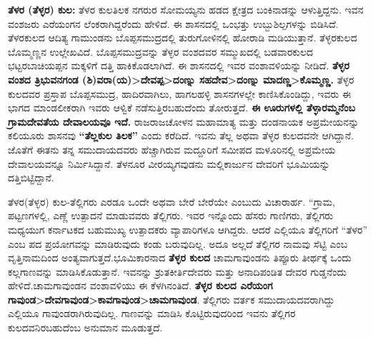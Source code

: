 \textbf{ತೆಳರ (ತೆಳ್ಳರ) ಕುಲ:} ತೆಳರ ಕುಲತಿಲಕ ನಗರುರ ಸೋಮಯ್ಯನು ಹಡದ ಕ್ಷೇತ್ರದ ಬಂಕಿನಾಡನ್ನು ಆಳುತ್ತಿದ್ದನು. ಇವನ ವಂಶಜರು ಎರೆಯಂಗನ ಲೆಂಕರಾಗಿದ್ದರೆಂದು ಹೇಳಿದೆ. ಈ ಶಾಸನದಲ್ಲಿ ಒಂಭತ್ತು ಉಬ್ಬುಶಿಲ್ಪಗಳನ್ನು ಬಿಡಿಸಿದೆ. ತೆಳರಕುಲದ ಆದಿತ್ಯ ಗಾಮುಂಡನು ಬೊಪ್ಪಸಮುದ್ರದಲ್ಲಿ ತುರುಗೋಳಿನಲ್ಲಿ ಹೋರಾಡಿ ಮಡಿಯುತ್ತಾನೆ. ತೆಳ್ಳರಕುಲದ ಬೊಮ್ಮಣ್ಣನ ಉಲ್ಲೇಖವಿದೆ. ಬೊಪ್ಪಸಮುದ್ರವನ್ನು ತೆಳ್ಳರ ವಂಶದವರ ಸಮ್ಮುಖದಲ್ಲಿ ಬಡವಾರಕುಲದ ಭಟ್ಟರಬಾಚಿಯಪ್ಪನ ಮಕ್ಕಳಿಗೆ ದತ್ತಿ ಹಾಕಿಕೊಡಲಾಗಿದೆ. ಈ ಶಾಸನದಲ್ಲಿ ಇವರ ವಂಶಾವಳಿಯನ್ನು ನೀಡಿದೆ. \textbf{ತೆಳ್ಳರ ವಂಶದ ತ್ರಿಭುವನಗಂಡ (ಶಿ)ವರಾ(ಯ)\textgreater  ದೇವಪ್ಪ\textgreater  ದಂಣ್ನು ಸಹದೇವ\textgreater  ದಂಣ್ನು ಮಾದಣ್ಣ\textgreater  ಕೊಮ್ಮಣ್ಣ. } ತೆಳ್ಳರ ಕುಲದವರ ಪ್ರಸ್ತಾಪ ಬೊಪ್ಪಸಮುದ್ರ, ಹಾದಿರವಾಗಿಲು, ಹಾಗಲಹಳ್ಳಿ ಶಾಸನಗಳಲ್ಲೇ ಕಾಣಿಸಿಕೊಂಡಿದ್ದು, ಇವರು ಈ ಭಾಗದ ಮಾಂಡಲೀಕರಾಗಿ ಇವರು ಆಳ್ವಿಕೆ ನಡೆಸುತ್ತಿರಬಹುದೆಂದು ತೋರುತ್ತದೆ. \textbf{ಈ ಊರುಗಳಲ್ಲಿ ತೆಳ್ಳಾರಮ್ಮನೆಂಬ ಗ್ರಾಮದೇವತೆಯ ದೇವಾಲಯವೂ ಇದೆ.} ರಾಜರಾಜಚೋಳನ ಮಹಾಮಾತ್ಯ ಮತ್ತು ದಂಡನಾಯಕ ಅಪ್ರಮೇಯನನ್ನು ಕಲಿಯೂರು ಶಾಸನವು \textbf{“ತೆಲ್ಲಕುಲ ತಿಲಕ”} ಎಂದು ಕರೆದಿದೆ. ಇವನು ತೆಲ್ಲ ಅಥವಾ ತೆಳ್ಳರ ಕುಲದವನೇ ಆಗಿದ್ದಾನೆ. ಜೊತೆಗೆ ಈತನು ತನ್ನ ಸಮುದಾಯದವರು ಹೆಚ್ಚಾಗಿರುವ ಮದ್ದೂರಿಗೆ ಸಮೀಪದ ಮಳೂರಿನಲ್ಲಿ ಅಪ್ರಮೇಯ ದೇವಾಲಯವನ್ನೂ ನಿರ್ಮಿಸಿದ್ದಾನೆ. ತೆಳನೂರ ವೀರಯ್ಯಗವುಡನು ಮಲ್ಲಿಕಾರ್ಜುನ ದೇವರಿಗೆ ಭೂಮಿಯನ್ನು ದತ್ತಿಬಿಟ್ಟಿದ್ದಾನೆ.

ತೆಳರ(ತೆಳ್ಳರ) ಕುಲ-ತೆಲ್ಲಿಗರು ಎರಡೂ ಒಂದೇ ಅಥವಾ ಬೇರೆ ಬೇರೆಯೇ ಎಂಬುದು ವಿಚಾರಾರ್ಹ. “ಗ್ರಾಮ, ಪಟ್ಟಣಗಳಲ್ಲಿ, ಎಣ್ಣೆ ಉತ್ಪಾದನೆ ಮಾಡುವವರು ತೆಲ್ಲಿಗರು. ಇವರ ಇನ್ನೊಂದು ಹೆಸರು ಗಾಣಿಗರು, ತೆಲ್ಲಿಗರು ಮಧ್ಯಯುಗ ಕರ್ನಾಟಕದ ಬಹುಮುಖ್ಯ ಉತ್ಪಾದಕರು ವ್ಯಾಪಾರಿಗಳೂ ಆಗಿದ್ದರು. ಆದರೆ ಎಲ್ಲಿಯೂ ತೆಲ್ಲಿಗರಿಗೆ “ತೆಳರ” ಎಂಬ ಪದ ಪ್ರಯೋಗವನ್ನು ಮಾಡಿರುವುದು ಕಂಡು ಬರುವುದಿಲ್ಲ. ಅದೂ ಅಲ್ಲದೆ ತೆಲ್ಲಿಗರ ನಾಮವು ಸೆಟ್ಟಿ ಎಂಬ ವೃತ್ತಿನಾಮದಿಂದ ಅಂತ್ಯವಾಗುತ್ತದೆ.ಭೂಮಿಕಾರನಾದ \textbf{ತೆಳ್ಳರ ಕುಲದ} ಚಾಮಗಾವುಂಡನು ತಿಪ್ಪೂರು ತೀರ್ಥಕ್ಕೆ ಒಂದು ಕಲ್ಲಗಾಣವನ್ನು ಮಾಡಿಸಿಕೊಡುತ್ತಾನೆ. ಇವನನ್ನು ಶ್ರುತಕೀರ್ತಿದೇವರು ಮತ್ತು ಅನಾದಿಪಂಡಿತ ದೇವರ ಗುಡ್ಡನೆಂದು ಹೇಳಿದೆ.\break ಚಾಮಗಾವುಂಡನ ವಂಶಾವಳಿಯು ಈ ಕೆಳಗಿನಂತಿದೆ. \textbf{ತೆಳ್ಳರ ಕುಲದ ಎರೆಯಂಗ ಗಾವುಂಡ\textgreater ದೇವಗಾವುಂಡ\textgreater ಕಾವಗಾವುಂಡ\textgreater \general{\break }ಚಾಮಗಾವುಂಡ}. ತೆಲ್ಲಿಗರು ವರ್ತಕ ಸಮುದಾಯದವರಾಗಿದ್ದು ಎಲ್ಲಿಯೂ ಗಾವುಂಡರಾಗಿರುವುದಿಲ್ಲ. ಗಾಣವನ್ನು ಮಾಡಿಸಿ ಕೊಟ್ಟಿರುವುದರಿಂದ ಇವನು ತೆಲ್ಲಿಗರ ಕುಲದವನಿರಬಹುದೆಂಬ ಅನುಮಾನ ಮೂಡುತ್ತದೆ.


